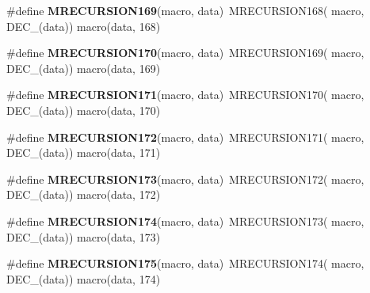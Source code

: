 \begin{DoxyCompactItemize}
\item 
\hypertarget{group__group__sam0__utils__mrecursion_gaca0a21c7432f21cb2659932191c15b95}{}\#define {\bfseries M\+R\+E\+C\+U\+R\+S\+I\+O\+N169}(macro,  data)~M\+R\+E\+C\+U\+R\+S\+I\+O\+N168(  macro, D\+E\+C\+\_\+(data))   macro(data, 168)\label{group__group__sam0__utils__mrecursion_gaca0a21c7432f21cb2659932191c15b95}

\item 
\hypertarget{group__group__sam0__utils__mrecursion_gaa0c6ffd6bc8a340f3acbbb7f8ec44e2e}{}\#define {\bfseries M\+R\+E\+C\+U\+R\+S\+I\+O\+N170}(macro,  data)~M\+R\+E\+C\+U\+R\+S\+I\+O\+N169(  macro, D\+E\+C\+\_\+(data))   macro(data, 169)\label{group__group__sam0__utils__mrecursion_gaa0c6ffd6bc8a340f3acbbb7f8ec44e2e}

\item 
\hypertarget{group__group__sam0__utils__mrecursion_ga915345baa48161291935eb1731b1f459}{}\#define {\bfseries M\+R\+E\+C\+U\+R\+S\+I\+O\+N171}(macro,  data)~M\+R\+E\+C\+U\+R\+S\+I\+O\+N170(  macro, D\+E\+C\+\_\+(data))   macro(data, 170)\label{group__group__sam0__utils__mrecursion_ga915345baa48161291935eb1731b1f459}

\item 
\hypertarget{group__group__sam0__utils__mrecursion_ga85f7c1151cdfbbf54a6fe28fc21c5615}{}\#define {\bfseries M\+R\+E\+C\+U\+R\+S\+I\+O\+N172}(macro,  data)~M\+R\+E\+C\+U\+R\+S\+I\+O\+N171(  macro, D\+E\+C\+\_\+(data))   macro(data, 171)\label{group__group__sam0__utils__mrecursion_ga85f7c1151cdfbbf54a6fe28fc21c5615}

\item 
\hypertarget{group__group__sam0__utils__mrecursion_ga783792df27d635d1463e416e45bf890e}{}\#define {\bfseries M\+R\+E\+C\+U\+R\+S\+I\+O\+N173}(macro,  data)~M\+R\+E\+C\+U\+R\+S\+I\+O\+N172(  macro, D\+E\+C\+\_\+(data))   macro(data, 172)\label{group__group__sam0__utils__mrecursion_ga783792df27d635d1463e416e45bf890e}

\item 
\hypertarget{group__group__sam0__utils__mrecursion_ga6023acb2866bab1aaa0f09c9bc0859f1}{}\#define {\bfseries M\+R\+E\+C\+U\+R\+S\+I\+O\+N174}(macro,  data)~M\+R\+E\+C\+U\+R\+S\+I\+O\+N173(  macro, D\+E\+C\+\_\+(data))   macro(data, 173)\label{group__group__sam0__utils__mrecursion_ga6023acb2866bab1aaa0f09c9bc0859f1}

\item 
\hypertarget{group__group__sam0__utils__mrecursion_ga5cf6e0c15dc63f70fd0bea450a714a61}{}\#define {\bfseries M\+R\+E\+C\+U\+R\+S\+I\+O\+N175}(macro,  data)~M\+R\+E\+C\+U\+R\+S\+I\+O\+N174(  macro, D\+E\+C\+\_\+(data))   macro(data, 174)\label{group__group__sam0__utils__mrecursion_ga5cf6e0c15dc63f70fd0bea450a714a61}


\end{DoxyCompactItemize}
